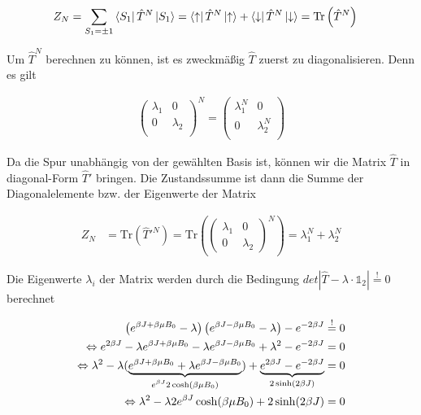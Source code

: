 \begin{align}
  \label{eq:27}
  Z_N &=\sum_{S_1=\pm 1} \left\langle S_1 \right| \hat T^N \left| S_1 \right\rangle =  \left\langle \uparrow \right| \hat T^N \left| \uparrow \right\rangle +  \left\langle \downarrow \right| \hat T^N \left| \downarrow \right\rangle = \text{Tr}\left( \hat T^N \right)
\end{align}

Um \(\hat T^N\) berechnen zu können, ist es zweckmäßig \(\hat T\) zuerst zu diagonalisieren. Denn es gilt 

\begin{align}
  \label{eq:42}
  \begin{pmatrix}
    \lambda_1&0\\
    0& \lambda_2\\
  \end{pmatrix}^N =
  \begin{pmatrix}
     \lambda_1^N&0\\
    0& \lambda_2^N\\
  \end{pmatrix}
\end{align}

Da die Spur unabhängig von der gewählten Basis ist, können wir die Matrix \(\hat T\) in diagonal-Form \(\hat T'\)  bringen. Die Zustandssumme ist dann die Summe der Diagonalelemente bzw. der Eigenwerte der Matrix

\begin{align}
  \label{eq:28}
  Z_N &= \text{Tr}\left( \hat T'^{N} \right) = 
\text{Tr}\left(
  \begin{pmatrix}
    \lambda_1&0\\
0&\lambda_2
  \end{pmatrix}^N
\right)=
\lambda_1^N +  \lambda_2^N
\end{align}

Die Eigenwerte \(\lambda_i\) der Matrix werden durch die Bedingung \(det|\hat T - \lambda\cdot\mathds 1_2|\stackrel{!}=0\) berechnet

\begin{align}
  \label{eq:29}
\left(  e^{\beta J  + \beta \mu B_0 } -\lambda  \right) \left( e^{\beta J  - \beta \mu B_0 } -\lambda  \right) - e^{-2\beta J}\stackrel{!}=0 \notag\\
\Leftrightarrow e^{2\beta J} - \lambda e^{\beta J  + \beta \mu B_0 } - \lambda e^{\beta J  - \beta \mu B_0 } + \lambda^2 - e^{-2\beta J} =0 \notag\\
\Leftrightarrow \lambda^2 - \lambda (\underbr{e^{\beta J  + \beta \mu B_0 } + \lambda e^{\beta J  - \beta \mu B_0 }}_{e^{\beta J}2\cosh(\beta \mu B_0 ) }) + \underbr{ e^{2\beta J} - e^{-2\beta J}}_{2\sinh(2\beta J)} =0 \notag\\
\Leftrightarrow \lambda^2 - \lambda 2 e^{\beta J}\cosh(\beta \mu B_0 )  + 2\sinh(2\beta J) =0 \notag\\
\end{align}

